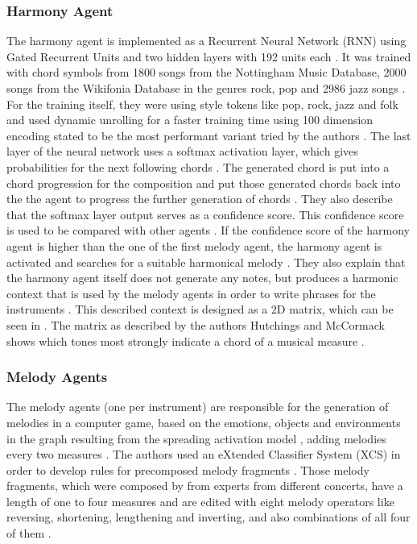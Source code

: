 \subsubsection{Harmony Agent}

The harmony agent is implemented as a Recurrent Neural 
Network (RNN) using Gated Recurrent Units and two hidden
layers with 192 units each \cite{hutMcCormAms}.
It was trained with chord symbols from 1800 songs from
the Nottingham Music Database, 2000 songs from the
Wikifonia Database in the genres rock, pop and 2986 jazz songs \cite{hutMcCormAms}.
For the training itself, they were using style tokens
like pop, rock, jazz and folk and used dynamic unrolling 
for a faster training time using 100 dimension encoding stated to be the most performant variant tried by the authors \cite{hutMcCormAms}.
The last layer of the neural network uses a softmax
activation layer, which gives probabilities for the 
next following chords \cite{hutMcCormAms}. The generated chord is put into a chord progression
for the composition and put those generated chords back
into the the agent to progress the further generation 
of chords \cite{hutMcCormAms}. They also describe that
the softmax layer output serves as a confidence score.
This confidence score is used to be compared with other
agents \cite{hutMcCormAms}. If the confidence score of
the harmony agent is higher than the one of the first
melody agent, the harmony agent is activated 
and searches for a suitable harmonical melody 
\cite{hutMcCormAms}. They also explain that the harmony
agent itself does not generate any notes, but produces a
harmonic context that is used by the melody agents
in order to write phrases for the instruments \cite{hutMcCormAms}. This described context is designed
as a 2D matrix, which can be seen in \cite{hutMcCormAms}.
The matrix as described by the authors Hutchings and 
McCormack shows which tones most strongly indicate a chord
of a musical measure \cite{hutMcCormAms}.

\subsubsection{Melody Agents}

The melody agents (one per instrument) are responsible
for the generation of melodies in a computer game, based 
on the emotions, objects and environments in the graph
resulting from the spreading activation model \cite{hutMcCormAms}, adding melodies every two measures \cite{hutMcCormAms}.
The authors used an eXtended Classifier System (XCS) in
order to develop rules for precomposed melody fragments \cite{hutMcCormAms}.
Those melody fragments, which were composed by from 
experts from different concerts, have a length of one to 
four measures and are edited with eight melody operators
like reversing, shortening, lengthening and inverting, and 
also combinations of all four of them \cite{hutMcCormAms}.

